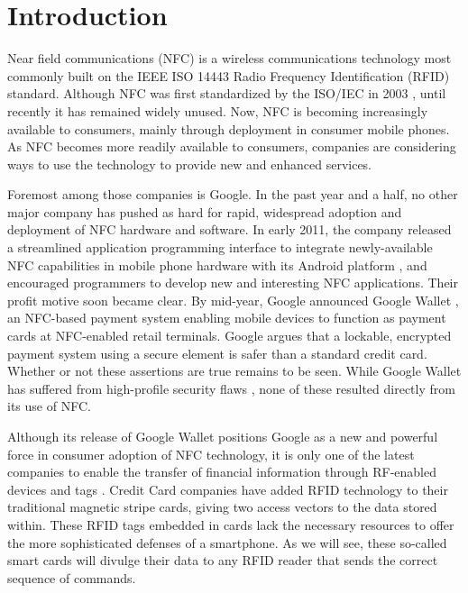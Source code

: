 \documentclass{sig-alternate}
\begin{document}
\section{Introduction}
Near field communications (NFC) is a wireless communications technology most commonly built on the IEEE ISO 14443 Radio Frequency Identification (RFID) standard.  Although NFC was first standardized by the ISO/IEC in 2003 \cite{ecma-nfc-adoption}, until recently it has remained widely unused.  Now, NFC is becoming increasingly available to consumers, mainly through deployment in consumer mobile phones.  As NFC becomes more readily available to consumers, companies are considering ways to use the technology to provide new and enhanced services.

Foremost among those companies is Google.  In the past year and a half, no other major company has pushed as hard for rapid, widespread adoption and deployment of NFC hardware and software.  In early 2011, the company released a streamlined application programming interface to integrate newly-available NFC capabilities in mobile phone hardware with its Android platform \cite{nfcworld-nfc-additions-android-2.3.3}, and encouraged programmers to develop new and interesting NFC applications.  Their profit motive soon became clear.  By mid-year, Google announced Google Wallet \cite{google-blog-1}, an NFC-based payment system enabling mobile devices to function as payment cards at NFC-enabled retail terminals.  Google argues \cite{google-wallet-security-1} that a lockable, encrypted payment system using a secure element is safer than a standard credit card.  Whether or not these assertions are true remains to be seen.  While Google Wallet has suffered from high-profile security flaws \cite{esecurityplanet-google-wallet-hacked}, none of these resulted directly from its use of NFC.

Although its release of Google Wallet positions Google as a new and powerful force in consumer adoption of NFC technology, it is only one of the latest companies to enable the transfer of financial information through RF-enabled devices and tags \cite{smartcardaliance-more-visa-paywave}.  Credit Card companies have added RFID technology to their traditional magnetic stripe cards, giving two access vectors to the data stored within.  These RFID tags embedded in cards lack the necessary resources to offer the more sophisticated defenses of a smartphone.  As we will see, these so-called smart cards will divulge their data to any RFID reader that sends the correct sequence of commands.    
\end{document}
